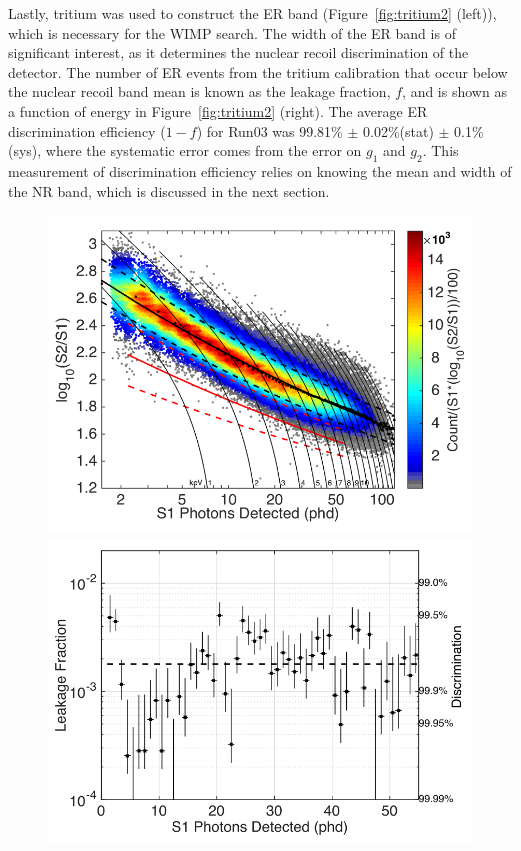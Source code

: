 Lastly, tritium was used to construct the \ac{ER} band (Figure~\ref{fig:tritium2} (left)), which is necessary for the \ac{WIMP} search. The width of the \ac{ER} band is of significant interest, as it determines the nuclear recoil discrimination of the detector. The number of \ac{ER} events from the tritium calibration that occur below the nuclear recoil band mean is known as the leakage fraction, $f$, and is shown as a function of energy in Figure~\ref{fig:tritium2} (right). The average \ac{ER} discrimination efficiency ($1-f$) for Run03 was 99.81\% $\pm$ 0.02\%(stat) $\pm$ 0.1\%(sys), where the systematic error comes from the error on $g_{1}$ and $g_{2}$. This measurement of discrimination efficiency relies on knowing the mean and width of the \ac{NR} band, which is discussed in the next section.

\begin{figure}[htbp]
\begin{center}
\includegraphics[width=\halffig]{figures/lux/lux_tritium2a.png}
\includegraphics[width=\halffig]{figures/lux/lux_tritium2b.png}

\end{center}
\end{figure}
